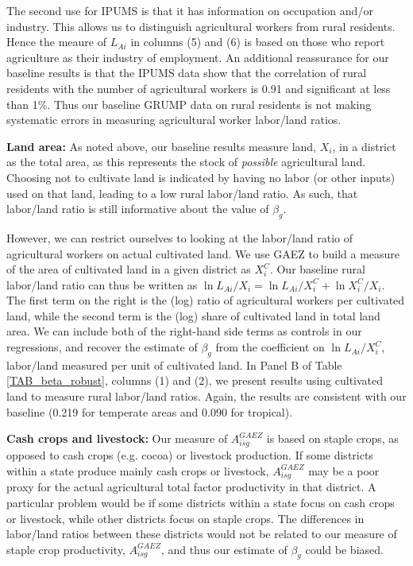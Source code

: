 \documentclass[11pt]{article}
\begin{document}
The second use for IPUMS is that it has information on occupation and/or industry. This allows us to distinguish agricultural workers from rural residents. Hence the meaure of $L_{Ai}$ in columns (5) and (6) is based on those who report agriculture as their industry of employment. An additional reassurance for our baseline results is that the IPUMS data show that the correlation of rural residents with the number of agricultural workers is 0.91 and significant at less than 1\%. Thus our baseline GRUMP data on rural residents is not making systematic errors in measuring agricultural worker labor/land ratios.

\vspace{.5cm}\noindent\textbf{Land area:} As noted above, our baseline results measure land, $X_i$, in a district as the total area, as this represents the stock of \textit{possible} agricultural land. Choosing not to cultivate land is indicated by having no labor (or other inputs) used on that land, leading to a low rural labor/land ratio. As such, that labor/land ratio is still informative about the value of $\beta_g$.

However, we can restrict ourselves to looking at the labor/land ratio of agricultural workers on actual cultivated land. We use GAEZ to build a measure of the area of cultivated land in a given district as $X^C_i$. Our baseline rural labor/land ratio can thus be written as $\ln L_{Ai}/X_i = \ln L_{Ai}/X_i^C + \ln X_i^C/X_i$. The first term on the right is the (log) ratio of agricultural workers per cultivated land, while the second term is the (log) share of cultivated land in total land area. We can include both of the right-hand side terms as controls in our regressions, and recover the estimate of $\beta_g$ from the coefficient on $\ln L_{Ai}/X_i^C$, labor/land measured per unit of cultivated land. In Panel B of Table \ref{TAB_beta_robust}, columns (1) and (2), we present results using cultivated land to measure rural labor/land ratios. Again, the results are consistent with our baseline (0.219 for temperate areas and 0.090 for tropical). 

\vspace{.5cm}\noindent\textbf{Cash crops and livestock:} Our measure of $A_{isg}^{GAEZ}$ is based on staple crops, as opposed to cash crops (e.g. cocoa) or livestock production. If some districts within a state produce mainly cash crops or livestock, $A_{isg}^{GAEZ}$ may be a poor proxy for the actual agricultural total factor productivity in that district. A particular problem would be if some districts within a state focus on cash crops or livestock, while other districts focus on staple crops. The differences in labor/land ratios between these districts would not be related to our measure of staple crop productivity, $A_{isg}^{GAEZ}$, and thus our estimate of $\beta_g$ could be biased. 
\end{document}

